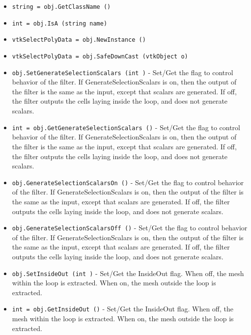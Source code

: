 \begin{itemize}
\item  \verb|string = obj.GetClassName ()|

\item  \verb|int = obj.IsA (string name)|

\item  \verb|vtkSelectPolyData = obj.NewInstance ()|

\item  \verb|vtkSelectPolyData = obj.SafeDownCast (vtkObject o)|

\item  \verb|obj.SetGenerateSelectionScalars (int )| -  Set/Get the flag to control behavior of the filter. If
 GenerateSelectionScalars is on, then the output of the filter
 is the same as the input, except that scalars are generated.
 If off, the filter outputs the cells laying inside the loop, and
 does not generate scalars.

\item  \verb|int = obj.GetGenerateSelectionScalars ()| -  Set/Get the flag to control behavior of the filter. If
 GenerateSelectionScalars is on, then the output of the filter
 is the same as the input, except that scalars are generated.
 If off, the filter outputs the cells laying inside the loop, and
 does not generate scalars.

\item  \verb|obj.GenerateSelectionScalarsOn ()| -  Set/Get the flag to control behavior of the filter. If
 GenerateSelectionScalars is on, then the output of the filter
 is the same as the input, except that scalars are generated.
 If off, the filter outputs the cells laying inside the loop, and
 does not generate scalars.

\item  \verb|obj.GenerateSelectionScalarsOff ()| -  Set/Get the flag to control behavior of the filter. If
 GenerateSelectionScalars is on, then the output of the filter
 is the same as the input, except that scalars are generated.
 If off, the filter outputs the cells laying inside the loop, and
 does not generate scalars.

\item  \verb|obj.SetInsideOut (int )| -  Set/Get the InsideOut flag. When off, the mesh within the loop is
 extracted. When on, the mesh outside the loop is extracted.

\item  \verb|int = obj.GetInsideOut ()| -  Set/Get the InsideOut flag. When off, the mesh within the loop is
 extracted. When on, the mesh outside the loop is extracted.


\end{itemize}
